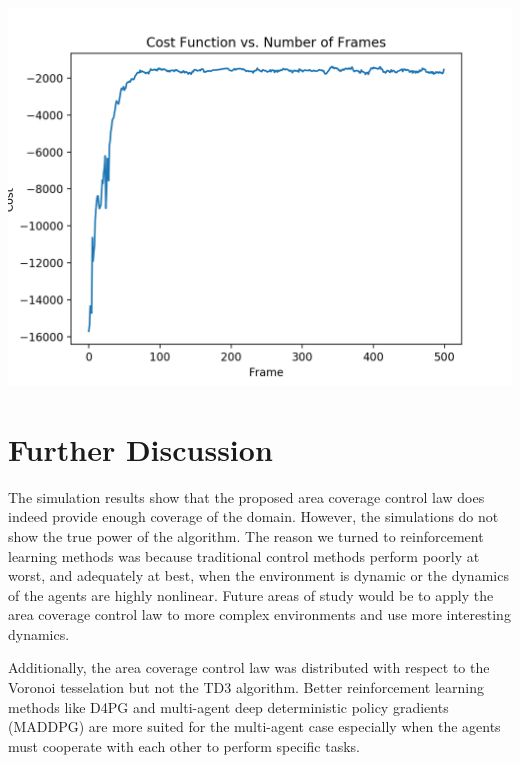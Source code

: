 \documentclass[10pt,conference]{IEEEtran}
\begin{document}
\begin{center}
	\includegraphics[scale=.2]{poster_sim3_cost_}
\end{center}
\section{Further Discussion}
The simulation results show that the proposed area coverage control law does indeed provide enough coverage of the domain. However, the simulations do not show the true power of the algorithm. The reason we turned to reinforcement learning methods was because traditional control methods perform poorly at worst, and adequately at best, when the environment is dynamic or the dynamics of the agents are highly nonlinear. Future areas of study would be to apply the area coverage control law to more complex environments and use more interesting dynamics. 

Additionally, the area coverage control law was distributed with respect to the Voronoi tesselation but not the TD3 algorithm. Better reinforcement learning methods like D4PG \cite{barth-maron2018distributional} and multi-agent deep deterministic policy gradients (MADDPG) \cite{lowe2017multiagent} are more suited for the multi-agent case especially when the agents must cooperate with each other to perform specific tasks. 
\end{document}
